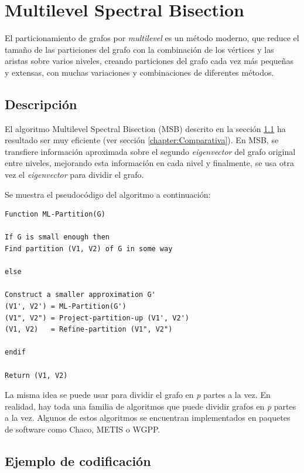 \newpage
\section{Multilevel Spectral Bisection}\label{Multilevel-Spectral-Bisection}

El particionamiento de grafos por \textit{multilevel} es un método moderno, que reduce el tamaño de las particiones del grafo con la combinación de los vértices y las aristas sobre varios niveles, creando particiones del grafo cada vez más pequeñas y extensas, con muchas variaciones y combinaciones de diferentes métodos.

\subsection{Descripción}\label{msb_description}

El algoritmo Multilevel Spectral Bisection (MSB) descrito en la sección \ref{msb_description} ha resultado ser muy eficiente (ver sección \ref{chapter:Comparativa}). En MSB, se transfiere información aproximada sobre el segundo \textit{eigenvector} del grafo original entre niveles, mejorando esta información en cada nivel y finalmente, se usa otra vez el \textit{eigenvector} para dividir el grafo. 

Se muestra el pseudocódigo del algoritmo a continuación:

\begin{lstlisting}[frame=single] 
Function ML-Partition(G)

If G is small enough then
Find partition (V1, V2) of G in some way

else

Construct a smaller approximation G'
(V1', V2') = ML-Partition(G')
(V1", V2") = Project-partition-up (V1', V2')
(V1, V2)   = Refine-partition (V1", V2")

endif

Return (V1, V2)
\end{lstlisting}

La misma idea se puede usar para dividir el grafo en \textit{p} partes a la vez. En realidad, hay toda una familia de algoritmos que puede dividir grafos en \textit{p} partes a la vez. Algunos de estos algoritmos se encuentran implementados en paquetes de software como Chaco\cite{Chaco}, METIS\cite{MeTis} o WGPP\cite{WGPP}.

\subsection{Ejemplo de codificación}

